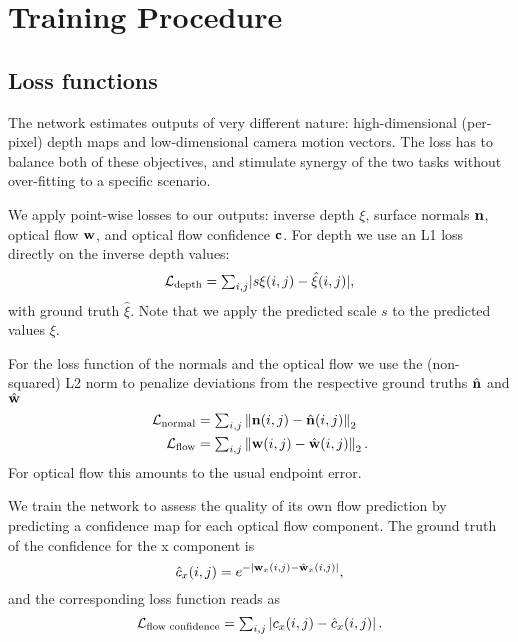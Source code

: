 \documentclass[10pt,twocolumn,letterpaper]{article}
\begin{document}
\section{Training Procedure}
\label{sec:training}

\subsection{Loss functions}

The network estimates outputs of very different nature: high-dimensional (per-pixel) depth maps and low-dimensional camera motion vectors. 
The loss has to balance both of these objectives, and stimulate synergy of the two tasks without over-fitting to a specific scenario. 

We apply point-wise losses to our outputs: inverse depth $\xi$, surface normals $\mathbf{n}$, optical flow $\mathbf{w}$, and optical flow confidence $\mathbf{c}$.
For depth we use an L1 loss directly on the inverse depth values:
\begin{equation}
\label{eq:loss_depth}
\mathcal{L}_\text{depth} = \textstyle{\sum_{i,j}} \vert s\xi(i,j) - \hat{\xi}(i,j) \vert, 
\end{equation}
with ground truth $\hat\xi$.
Note that we apply the predicted scale $s$ to the predicted values $\xi$.

For the loss function of the normals and the optical flow we use the (non-squared) L2 norm to penalize deviations from the respective ground truths $\hat{\mathbf{n}}$ and $\hat{\mathbf{w}}$
\begin{equation}
\begin{aligned}
\mathcal{L}_\text{normal} &= \textstyle{\sum_{i,j}} \left\Vert \mathbf{n}(i,j) - \hat{\mathbf{n}}(i,j) \right\Vert_2 \\
\mathcal{L}_\text{flow} &= \textstyle{\sum_{i,j}} \left\Vert \mathbf{w}(i,j) - \hat{\mathbf{w}}(i,j) \right\Vert_2.
\end{aligned}
\end{equation}
For optical flow this amounts to the usual endpoint error.




 We train the network to assess the quality of its own flow prediction by predicting a confidence map for each optical flow component.
 The ground truth of the confidence for the x component is 
 \begin{equation}
 \hat{c}_x(i,j) = e^{- \vert\mathbf{w}_x(i,j) - \hat{\mathbf{w}}_x(i,j)\vert},
 \end{equation}
 and the corresponding loss function reads as
 \begin{equation}
 \mathcal{L}_\text{flow confidence} = \textstyle{\sum_{i,j}} \left\vert c_x(i,j) - \hat{c}_x(i,j) \right\vert.
 \end{equation}
\end{document}
